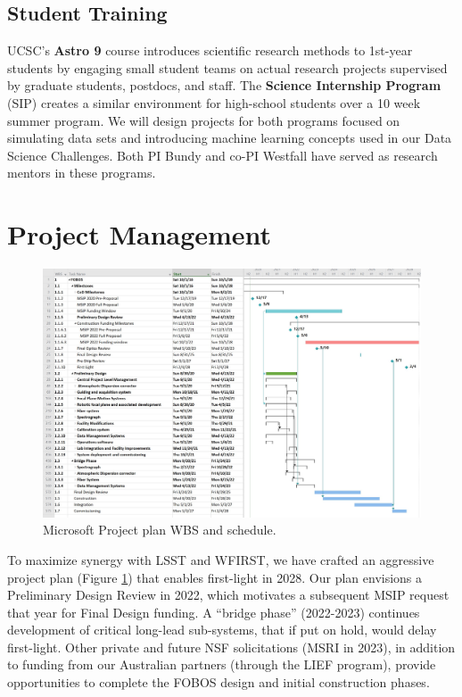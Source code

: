 \documentclass[oneside,11pt]{amsart}
\begin{document}
\subsection{Student Training} UCSC's {\bf Astro 9} course introduces
scientific research methods to 1st-year students by engaging small
student teams on actual research projects supervised by graduate
students, postdocs, and staff. The {\bf Science Internship Program}
(SIP) creates a similar environment for high-school students over a
10 week summer program. We will design projects for both programs
focused on simulating data sets and introducing machine learning
concepts used in our Data Science Challenges. Both PI Bundy and co-PI
Westfall have served as research mentors in these programs.

\section{Project Management}

\begin{figure}[h!]
\vskip -0.1in
\includegraphics[width=\textwidth]{figs/Pre-Proposal_Project_figure.jpg}
\caption{\small Microsoft Project plan WBS and schedule.}
\label{fig:gantt}
\end{figure}

To maximize synergy with LSST and WFIRST, we have crafted an
aggressive project plan (Figure \ref{fig:gantt}) that enables
first-light in 2028. Our plan envisions a Preliminary Design Review
in 2022, which motivates a subsequent MSIP request that year for
Final Design funding. A ``bridge phase'' (2022-2023) continues
development of critical long-lead sub-systems, that if put on hold,
would delay first-light. Other private and future NSF solicitations
(MSRI in 2023), in addition to funding from our Australian partners
(through the LIEF program), provide opportunities to complete the
FOBOS design and initial construction phases.
\end{document}
